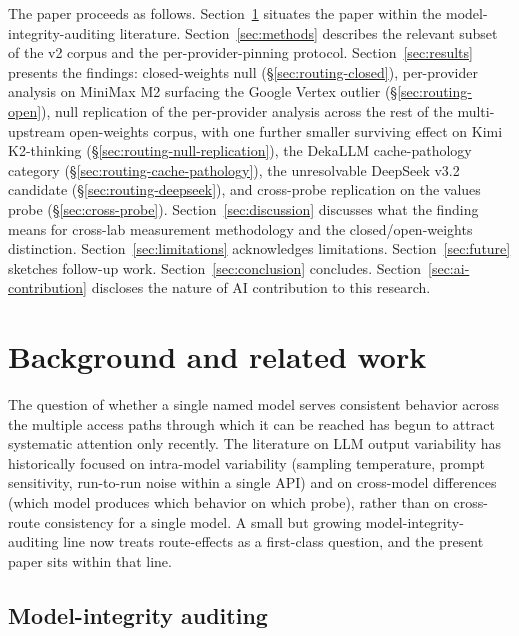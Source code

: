 \documentclass[11pt,a4paper]{article}
\begin{document}
\begin{sloppypar}
The paper proceeds as follows. Section~\ref{sec:background} situates the paper within the model-integrity-auditing literature. Section~\ref{sec:methods} describes the relevant subset of the v2 corpus and the per-provider-pinning protocol. Section~\ref{sec:results} presents the findings: closed-weights null (\S\ref{sec:routing-closed}), per-provider analysis on MiniMax M2 surfacing the Google Vertex outlier (\S\ref{sec:routing-open}), null replication of the per-provider analysis across the rest of the multi-upstream open-weights corpus, with one further smaller surviving effect on Kimi K2-thinking (\S\ref{sec:routing-null-replication}), the DekaLLM cache-pathology category (\S\ref{sec:routing-cache-pathology}), the unresolvable DeepSeek v3.2 candidate (\S\ref{sec:routing-deepseek}), and cross-probe replication on the values probe (\S\ref{sec:cross-probe}). Section~\ref{sec:discussion} discusses what the finding means for cross-lab measurement methodology and the closed/open-weights distinction. Section~\ref{sec:limitations} acknowledges limitations. Section~\ref{sec:future} sketches follow-up work. Section~\ref{sec:conclusion} concludes. Section~\ref{sec:ai-contribution} discloses the nature of AI contribution to this research.
\end{sloppypar}

\section{Background and related work}
\label{sec:background}

The question of whether a single named model serves consistent behavior across the multiple access paths through which it can be reached has begun to attract systematic attention only recently. The literature on LLM output variability has historically focused on intra-model variability (sampling temperature, prompt sensitivity, run-to-run noise within a single API) and on cross-model differences (which model produces which behavior on which probe), rather than on cross-route consistency for a single model. A small but growing model-integrity-auditing line now treats route-effects as a first-class question, and the present paper sits within that line.

\subsection{Model-integrity auditing}
\end{document}
